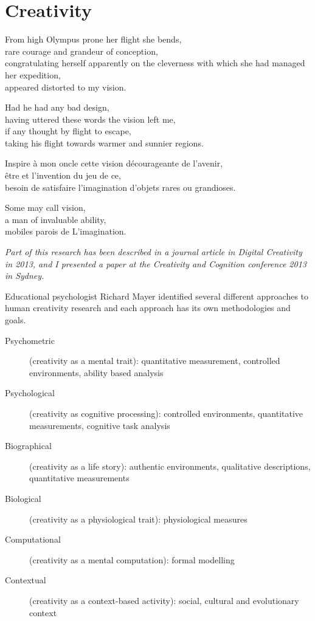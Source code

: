 
\chapter{Creativity}
\label{ch:creativity}

\startcontents[chapters]

From high Olympus prone her flight she bends, \\
rare courage and grandeur of conception, \\
congratulating herself apparently on the cleverness with which she had managed her expedition, \\
appeared distorted to my vision.

Had he had any bad design, \\
having uttered these words the vision left me, \\
if any thought by flight to escape, \\
taking his flight towards warmer and sunnier regions.

Inspire à mon oncle cette vision décourageante de l'avenir, \\
être et l'invention du jeu de ce, \\
besoin de satisfaire l'imagination d'objets rares ou grandioses.

Some may call vision, \\
a man of invaluable ability, \\
mobiles parois de L'imagination.


\minicontents

\emph{Part of this research has been described in a journal article in Digital Creativity in 2013, and I presented a paper at the Creativity and Cognition conference 2013 in Sydney.}

\grule %


Educational psychologist Richard Mayer identified several different approaches to human creativity research and each approach has its own methodologies and goals. \autocite[p.453]{Mayer1999}

\begin{description}
  \item [Psychometric] (creativity as a mental trait): quantitative measurement, controlled environments, ability based analysis
  \item [Psychological] (creativity as cognitive processing): controlled environments, quantitative measurements, cognitive task analysis
  \item [Biographical] (creativity as a life story): authentic environments, qualitative descriptions, quantitative measurements
  \item [Biological] (creativity as a physiological trait): physiological measures
  \item [Computational] (creativity as a mental computation): formal modelling
  \item [Contextual] (creativity as a context-based activity): social, cultural and evolutionary context
\end{description}

